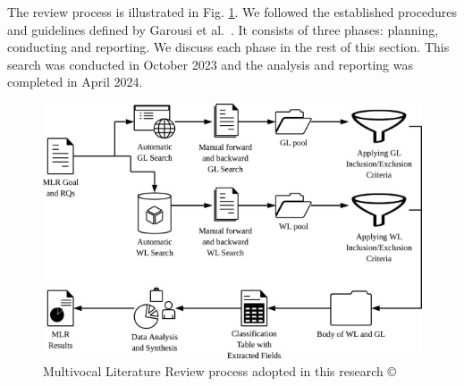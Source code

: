 The review process is illustrated in Fig. \ref{fig:MLRprocess}.
We followed the established procedures and guidelines defined by Garousi et al.~\cite{GAROUSI2019101}.
It consists of three phases: planning, conducting and reporting.
We discuss each phase in the rest of this section.
This search was conducted in October 2023 and the analysis and reporting was completed in April 2024.

\begin{figure}
  \includegraphics[width=\textwidth]{MLRprocess.jpg}
  \caption{Multivocal Literature Review process adopted in this research \copyright~\cite{SALTAN2021106510}}
  
 \label{fig:MLRprocess}
\end{figure}

